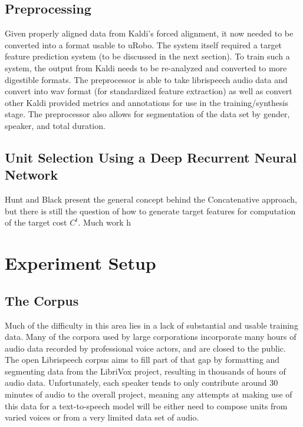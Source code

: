 \documentclass[10pt,a4paper,twocolumn]{article}
\begin{document}
\subsection{Preprocessing}
Given properly aligned data from Kaldi's forced alignment, it now needed to be converted into a format usable to uRobo. The system itself required a target feature prediction system (to be discussed in the next section). To train such a system, the output from Kaldi needs to be re-analyzed and converted to more digestible formats. The preprocessor is able to take librispeech audio data and convert into wav format (for standardized feature extraction) as well as convert other Kaldi provided metrics and annotations for use in the training/synthesis stage. The preprocessor also allows for segmentation of the data set by gender, speaker, and total duration.\par


\subsection{Unit Selection Using a Deep Recurrent Neural Network}
Hunt and Black present the general concept behind the Concatenative approach, but there is still the question of how to generate target features for computation of the target cost $C^t$. Much work h
\section{Experiment Setup}
\subsection{The Corpus}
Much of the difficulty in this area lies in a lack of substantial and usable training data. Many of the corpora used by large corporations incorporate many hours of audio data recorded by professional voice actors, and are closed to the public. The open Librispeech corpus\cite{unknown} aims to fill part of that gap by formatting and segmenting data from the LibriVox project, resulting in thousands of hours of audio data. Unfortunately, each speaker tends to only contribute around 30 minutes of audio to the overall project, meaning any attempts at making use of this data for a text-to-speech model will be either need to compose units from varied voices or from a very limited data set of audio.\par
\end{document}
